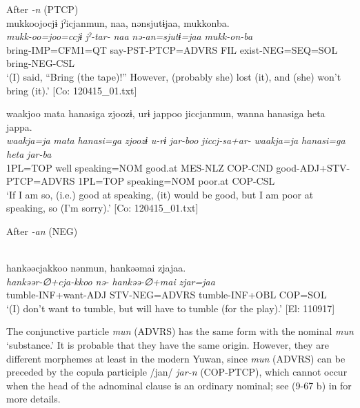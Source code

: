 \ea\label{ex:10.31}  
  \ea
  \exi{} After \textit{{}-n} (PTCP)\\
  \ex  %
      \glll    mukkoojocjɨ  jˀicjanmun,  naa,  nənsjutɨjaa,  mukkonba.      \\
      \textit{mukk-oo=joo=ccjɨ}  \textit{jˀ-tar-}  \textit{naa}  \textit{nə-an=sjutɨ=jaa}    \textit{mukk-on-ba}      \\
      bring-IMP=CFM1=QT  say-PST-PTCP=ADVRS  FIL  exist-NEG=SEQ=SOL   bring-NEG-CSL     \\
      \glt       ‘(I) said, “Bring (the tape)!” However, (probably she) lost (it), and (she) won’t bring (it).’ [Co: 120415\_01.txt]

 \ex  %
      \glll    waakjoo  mata  hanasiga  zjoozɨ,  urɨ  jappoo  jiccjanmun,  wanna  hanasiga  {\textbar}heta{\textbar}  jappa.      \\
      \textit{waakja=ja}  \textit{mata}  \textit{hanasi=ga}  \textit{zjoozɨ}  \textit{u-rɨ}  \textit{jar-boo}   \textit{jiccj-sa+ar-}  \textit{waakja=ja}  \textit{hanasi=ga}  \textit{heta}  \textit{jar-ba}      \\
      1PL=TOP  well  speaking=NOM  good.at  MES-NLZ  COP-CND   good-ADJ+STV-PTCP=ADVRS  1PL=TOP  speaking=NOM  poor.at  COP-CSL  \\
      \glt       ‘If I am so, (i.e.) good at speaking, (it) would be good, but I am poor at speaking, so (I’m sorry).’ [Co: 120415\_01.txt]

  \exi{} After \textit{{}-an} (NEG)

  \ex\relax  [= (9-50 b)]\\
      \glll    hankəəcjakkoo  nənmun,  hankəəmai  zjajaa.\\
      \textit{hankəər-∅+cja-kkoo}  \textit{nə-}  \textit{hankəə-∅+mai}  \textit{zjar=jaa}\\
      tumble-INF+want-ADJ  STV-NEG=ADVRS  tumble-INF+OBL  COP=SOL\\
      \glt       ‘(I) don’t want to tumble, but will have to tumble (for the play).’ [El: 110917]
    \z
\z

  The conjunctive particle \textit{mun} (ADVRS) has the same form with the nominal \textit{mun} ‘substance.’ It is probable that they have the same origin. However, they are different morphemes at least in the modern Yuwan, since \textit{mun} (ADVRS) can be preceded by the copula participle /jan/ \textit{jar-n} (COP-PTCP), which cannot occur when the head of the adnominal clause is an ordinary nominal; see (9-67 b) in  for more details.


